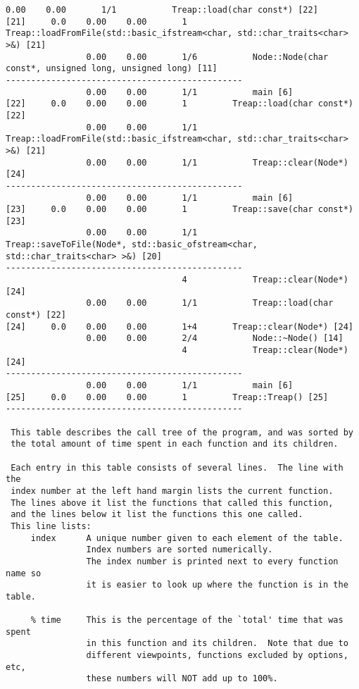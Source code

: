 \documentclass[12pt]{article}
\begin{document}
\begin{lstlisting}[breaklines]
                0.00    0.00       1/1           Treap::load(char const*) [22]
[21]     0.0    0.00    0.00       1         Treap::loadFromFile(std::basic_ifstream<char, std::char_traits<char> >&) [21]
                0.00    0.00       1/6           Node::Node(char const*, unsigned long, unsigned long) [11]
-----------------------------------------------
                0.00    0.00       1/1           main [6]
[22]     0.0    0.00    0.00       1         Treap::load(char const*) [22]
                0.00    0.00       1/1           Treap::loadFromFile(std::basic_ifstream<char, std::char_traits<char> >&) [21]
                0.00    0.00       1/1           Treap::clear(Node*) [24]
-----------------------------------------------
                0.00    0.00       1/1           main [6]
[23]     0.0    0.00    0.00       1         Treap::save(char const*) [23]
                0.00    0.00       1/1           Treap::saveToFile(Node*, std::basic_ofstream<char, std::char_traits<char> >&) [20]
-----------------------------------------------
                                   4             Treap::clear(Node*) [24]
                0.00    0.00       1/1           Treap::load(char const*) [22]
[24]     0.0    0.00    0.00       1+4       Treap::clear(Node*) [24]
                0.00    0.00       2/4           Node::~Node() [14]
                                   4             Treap::clear(Node*) [24]
-----------------------------------------------
                0.00    0.00       1/1           main [6]
[25]     0.0    0.00    0.00       1         Treap::Treap() [25]
-----------------------------------------------

 This table describes the call tree of the program, and was sorted by
 the total amount of time spent in each function and its children.

 Each entry in this table consists of several lines.  The line with the
 index number at the left hand margin lists the current function.
 The lines above it list the functions that called this function,
 and the lines below it list the functions this one called.
 This line lists:
     index      A unique number given to each element of the table.
                Index numbers are sorted numerically.
                The index number is printed next to every function name so
                it is easier to look up where the function is in the table.

     % time     This is the percentage of the `total' time that was spent
                in this function and its children.  Note that due to
                different viewpoints, functions excluded by options, etc,
                these numbers will NOT add up to 100%.


\end{lstlisting}
\end{document}
